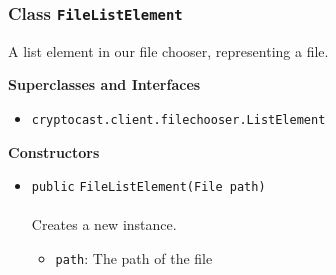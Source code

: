 \subsubsection{Class \lstinline|FileListElement|}
A list element in our file chooser, representing a file. \\
\noindent\begin{minipage}[t]{5cm}
\vspace{0.3em}
\hspace*{2em}
\vspace{0.3em}
\end{minipage}



\textbf{\sffamily Superclasses and Interfaces}
\begin{itemize}
\item \lstinline|cryptocast.client.filechooser.ListElement|
\end{itemize}


\textbf{\sffamily Constructors}
\begin{itemize}
\item \lstinline|public| \lstinline|FileListElement|\lstinline|(File path)|\\ \\[-0.6em]
Creates a new instance.
\begin{itemize}
\item \lstinline|path|: The path of the file
\end{itemize}



\end{itemize}


